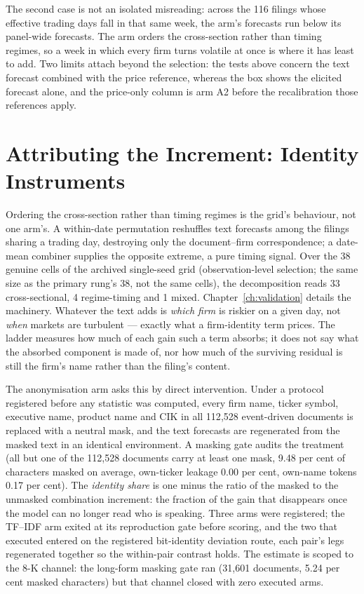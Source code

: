 The second case is not an isolated misreading: across the 116 filings whose effective trading days fall in that same week, the arm's forecasts run below its panel-wide forecasts. %
The arm orders the cross-section rather than timing regimes, so a week in which every firm turns volatile at once is where it has least to add. Two limits attach beyond the selection: the tests above concern the text forecast combined with the price reference, whereas the box shows the elicited forecast alone, and the price-only column is arm A2 before the recalibration those references apply.

\section{Attributing the Increment: Identity Instruments}
\label{sec:res-identity}

Ordering the cross-section rather than timing regimes is the grid's behaviour, not one arm's. A within-date permutation reshuffles text forecasts among the filings sharing a trading day, destroying only the document--firm correspondence; a date-mean combiner supplies the opposite extreme, a pure timing signal. Over the 38 genuine cells of the archived single-seed grid (observation-level selection; the same size as the primary rung's 38, not the same cells), the decomposition reads 33 cross-sectional, 4 regime-timing and 1 mixed. Chapter~\ref{ch:validation} details the machinery. %
Whatever the text adds is \emph{which firm} is riskier on a given day, not \emph{when} markets are turbulent --- exactly what a firm-identity term prices. The ladder measures how much of each gain such a term absorbs; it does not say what the absorbed component is made of, nor how much of the surviving residual is still the firm's name rather than the filing's content.

The anonymisation arm asks this by direct intervention. Under a protocol registered before any statistic was computed, every firm name, ticker symbol, executive name, product name and CIK in all 112{,}528 event-driven documents is replaced with a neutral mask, and the text forecasts are regenerated from the masked text in an identical environment. A masking gate audits the treatment (all but one of the 112{,}528 documents carry at least one mask, 9.48 per cent of characters masked on average, own-ticker leakage 0.00 per cent, own-name tokens 0.17 per cent). %
The \emph{identity share} is one minus the ratio of the masked to the unmasked combination increment: the fraction of the gain that disappears once the model can no longer read who is speaking. Three arms were registered; the TF--IDF arm exited at its reproduction gate before
scoring, and the two that executed entered on the registered bit-identity deviation
route, each pair's legs regenerated together so the within-pair contrast holds. %
The estimate is scoped to the 8-K channel: the long-form masking gate ran (31{,}601 documents, 5.24 per cent masked characters) but that channel closed with zero executed arms. %

